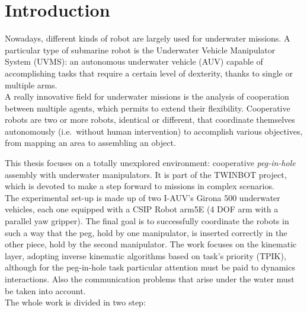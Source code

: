 

\chapter{Introduction}
\label{chap:introduction}
\ifpdf
    \graphicspath{{Introduction/Figures/PNG/}{Introduction/Figures/PDF/}{Introduction/Figures/}}
\else
    \graphicspath{{Introduction/Figures/EPS/}{Introduction/Figures/}}
\fi

Nowadays, different kinds of robot are largely used for underwater missions. A particular type of submarine robot is the Underwater Vehicle Manipulator System (UVMS): an autonomous underwater vehicle (AUV) capable of accomplishing tasks that require a certain level of dexterity, thanks to single or multiple arms.\\
A really innovative field for underwater missions is the analysis of cooperation between multiple agents, which permits to extend their flexibility. Cooperative robots are two or more robots, identical or different, that coordinate themselves autonomously (i.e.\ without human intervention) to accomplish various objectives, from mapping an area to assembling an object.   

This thesis focuses on a totally unexplored environment: cooperative \textit{peg-in-hole} assembly with underwater manipulators. It is part of the TWINBOT project, which is devoted to make a step forward to missions in complex scenarios.\\
The experimental set-up is made up of two I-AUV's Girona 500 underwater vehicles, each one equipped with a CSIP Robot arm5E (4 DOF arm with a parallel yaw gripper). The final goal is to successfully coordinate the robots in such a way that the peg, hold by one manipulator, is inserted correctly in the other piece, hold by the second manipulator.
The work focuses on the kinematic layer, adopting inverse kinematic algorithms based on task's priority (TPIK), although for the peg-in-hole task particular attention must be paid to dynamics interactions. Also the communication problems that arise under the water must be taken into account.  \\
The whole work is divided in two step: 

